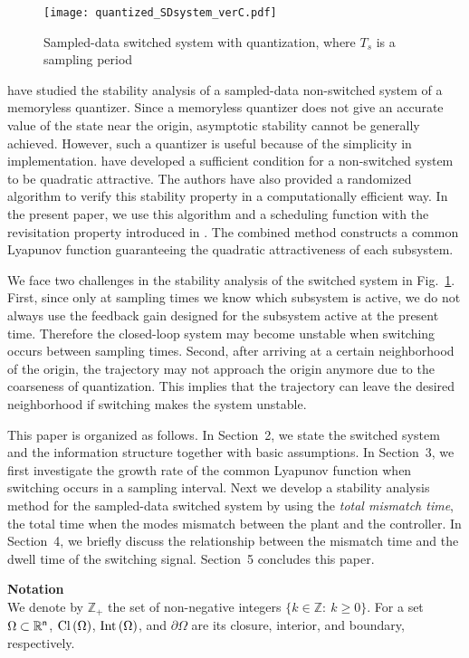 \documentclass[a4, 11pt]{article}
\newcommand{\Int}{\mathop{\rm Int~\!}}
\newcommand{\Cl}{\mathop{\rm Cl~\!}}
\begin{document}
 \begin{figure}[b]
 \centering
 \texttt{[image: quantized\_SDsystem\_verC.pdf]}
 \caption{Sampled-data switched system with quantization, where $T_s$ is a sampling period}
 \label{fig:WSDSLS}
 \end{figure}

\cite{Ishii2002Book,Ishii2004} have studied the stability analysis
of a sampled-data non-switched system of a memoryless quantizer.
Since a memoryless quantizer does not give an accurate value of the state near the origin, 
asymptotic stability cannot be generally achieved. 
However, 
such a quantizer is useful because of the simplicity in implementation.
\cite{Ishii2004} have developed a sufficient condition
for a non-switched system to be quadratic attractive. The authors have also
provided a randomized algorithm to verify this stability property in a computationally efficient way.
In the present paper, we use this algorithm and a scheduling function 
with the revisitation property introduced in \cite{Liberzon2004}.
The combined method constructs  a common Lyapunov function guaranteeing
the quadratic attractiveness of each subsystem.


We face two challenges in the stability analysis of the switched system in Fig.~\ref{fig:WSDSLS}.
First, since only at sampling times we know which subsystem is active, 
we do not always use the feedback gain designed for the subsystem active at
the present time.
Therefore
the closed-loop system may become unstable when switching occurs between sampling times.
Second, after arriving at a certain neighborhood of the origin,
the trajectory may not approach the origin anymore due to the coarseness of quantization. 
This implies that the trajectory can leave
the desired neighborhood if switching makes the system unstable.

This paper is organized as follows. 
In Section~2, we state the switched system and 
the information structure together with basic assumptions.
In Section~3, we first investigate the growth rate of the common
Lyapunov function when switching occurs in a sampling interval.
Next we develop
a stability analysis method for the sampled-data switched system 
by using
the {\em total mismatch time}, the total time when the modes 
mismatch between the plant and the controller.
In Section~4, we briefly discuss the relationship between the mismatch time
and the dwell time of the switching signal.
Section~5 concludes this paper.

\noindent
{\bf Notation} \\
We denote by $\mathbb{Z}_+$ the set of non-negative integers
$\{k \in \mathbb{Z}:~k \geq 0\}$.
For a set $\Omega \subset \mathbb{R}^{\sf n}$, $\Cl (\Omega)$, 
$\Int (\Omega)$, and $\partial \Omega$ are its closure,
interior, and boundary, respectively.
\end{document}
